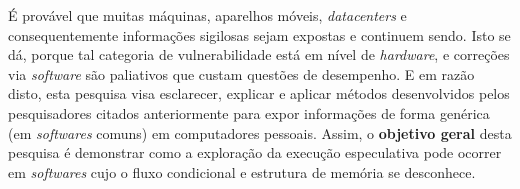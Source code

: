 \documentclass[
	article,			    %
	12pt,				    %
	oneside,			    %
	a4paper,			    %
	chapter=TITLE,		    %
	section=TITLE,		    %
	subsection=TITLE,	    %
	english,			    %
	brazil,				    %
	sumario=tradicional
]{abntex2}
\begin{document}
\begin{comment}
Em 03 de Janeiro de 2018, pesquisadores da Universidade Católica de Leuven e do IT de Israel, das Universidades de Michigan e Adelaide e da \emph{CSIRO Data61}, fizeram novas publicações comprovativas de duas novas derivações da \emph{Spectre}. Batizadas de \emph{Foreshadow}\footnote{Prefigurar, pressupor ou prévio ("fore", inglês). Assim como no \footnotemark[\numexpr\value{footnote}-2], o nome deriva da causa da falha.} e \emph{Foreshadow-NG}, em processadores de servidores e em máquinas virtuais \cite{vanbulck2018foreshadow}.

Em 01 de Março de 2019, pesquisadores do Instituto Politécnico de Worcester e da Universidade de Lübeck, publicaram um artigo expondo mais uma possibilidade de exploração do comportamento arquitetural dos processadores da \emph{Intel}. Chamada de \emph{Spoiler}, esta nova vulnerabilidade não é uma variação das anteriores e nenhum dos métodos de mitigação divulgados até a data desta pesquisa, suprimem esta nova forma de realizar vazamentos de informações \cite{islam2019spoiler}.

Tal assunto adquiriu grande importância na divulgação pelos veículos de comunicação, pois é provável que muitas máquinas, aparelhos móveis, \emph{datacenters} e consequentemente informações sigilosas sejam expostas e continuem sendo. Isto se dá, porque tal categoria de vulnerabilidade está em nível de \emph{hardware}, e correções via \emph{software} são paliativos que custam questões de desempenho.
\end{comment}
É provável que muitas máquinas, aparelhos móveis, \emph{datacenters} e consequentemente informações sigilosas sejam expostas e continuem sendo. Isto se dá, porque tal categoria de vulnerabilidade está em nível de \emph{hardware}, e correções via \emph{software} são paliativos que custam questões de desempenho. E em razão disto, esta pesquisa visa esclarecer, explicar e aplicar métodos desenvolvidos pelos pesquisadores citados anteriormente para expor informações de forma genérica (em \emph{softwares} comuns) em computadores pessoais. Assim, o \textbf{objetivo geral} desta pesquisa é demonstrar como a exploração da execução especulativa pode ocorrer em \emph{softwares} cujo o fluxo condicional e estrutura de memória se desconhece.
\end{document}
